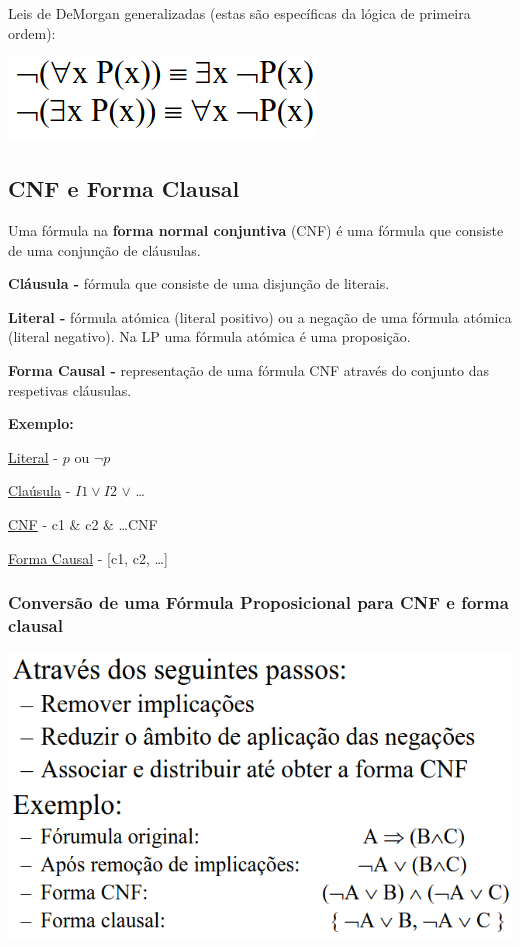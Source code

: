 \documentclass{article}
\begin{document}
Leis de DeMorgan generalizadas (estas são específicas
da lógica de primeira ordem):

\begin{center}
  \includegraphics[scale=0.35]{30}
\end{center}

\subsection{CNF e Forma Clausal}

Uma fórmula na \textbf{forma normal conjuntiva} (CNF) é uma fórmula que consiste de uma
conjunção de cláusulas.

\begin{flushleft}
  \textbf{Cláusula -} fórmula que consiste de uma
  disjunção de literais.

  \textbf{Literal -} fórmula atómica (literal positivo) ou a
  negação de uma fórmula atómica (literal negativo). Na LP uma
  fórmula atómica é uma proposição.

  \textbf{Forma Causal -} representação de uma fórmula CNF através do conjunto
  das respetivas cláusulas.
\end{flushleft}

\begin{flushleft}
  \textbf{Exemplo:}

  \uline{Literal} - $p$ ou $\neg p$

  \uline{Claúsula} - $I1 \vee I2$ $\vee$ \dots

  \uline{CNF} - c1 \& c2 \& \dots CNF

  \uline{Forma Causal} - [c1, c2, \dots]
\end{flushleft}

\pagebreak

\subsubsection{Conversão de uma Fórmula
Proposicional para CNF e forma clausal}

\begin{center}
  \includegraphics[scale=0.35]{31}
\end{center}
\end{document}
